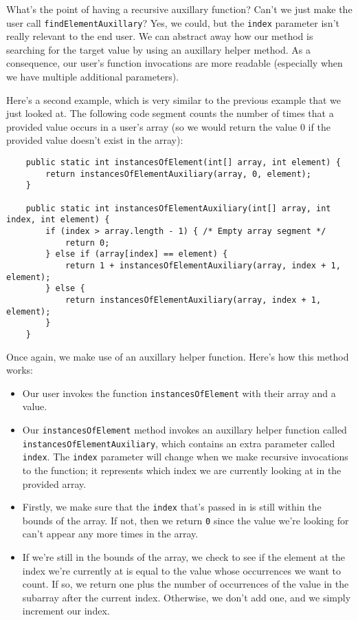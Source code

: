 What's the point of having a recursive auxillary function? Can't we just make the user call \verb!findElementAuxillary!? Yes, we could, but the \verb!index! parameter isn't really relevant to the end user. We can abstract away how our method is searching for the target value by using an auxillary helper method. As a consequence, our user's function invocations are more readable (especially when we have multiple additional parameters). 

Here's a second example, which is very similar to the previous example that we just looked at. The following code segment counts the number of times that a provided value occurs in a user's array (so we would return the value $0$ if the provided value doesn't exist in the array):

\begin{lstlisting}
    public static int instancesOfElement(int[] array, int element) {
		return instancesOfElementAuxiliary(array, 0, element);
	}

	public static int instancesOfElementAuxiliary(int[] array, int index, int element) {
		if (index > array.length - 1) { /* Empty array segment */
			return 0;
		} else if (array[index] == element) {
			return 1 + instancesOfElementAuxiliary(array, index + 1, element);
		} else {
			return instancesOfElementAuxiliary(array, index + 1, element);
		}
	}
\end{lstlisting}

Once again, we make use of an auxillary helper function. Here's how this method works:

\begin{itemize}
    \item Our user invokes the function \verb!instancesOfElement! with their array and a value.
    \item Our \verb!instancesOfElement! method invokes an auxillary helper function called \verb!instancesOfElementAuxiliary!, which contains an extra parameter called \verb!index!. The \verb!index! parameter will change when we make recursive invocations to the function; it represents which index we are currently looking at in the provided array.  
    \item Firstly, we make sure that the \verb!index! that's passed in is still within the bounds of the array. If not, then we return \verb!0! since the value we're looking for can't appear any more times in the array.
    \item If we're still in the bounds of the array, we check to see if the element at the index we're currently at is equal to the value whose occurrences we want to count. If so, we return one plus the number of occurrences of the value in the subarray after the current index. Otherwise, we don't add one, and we simply increment our index.
\end{itemize}


